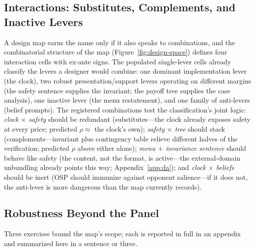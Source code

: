 \subsection{Interactions: Substitutes, Complements, and Inactive Levers}\label{sec:map-interactions}

A design map earns the name only if it also speaks to combinations, and the combinatorial structure of the map (Figure~\ref{fig:design-space}) defines four interaction cells with ex-ante signs. The populated single-lever cells already classify the levers a designer would combine: one dominant implementation lever (the clock), two robust presentation/support levers operating on different margins (the safety sentence supplies the invariant; the payoff tree supplies the case analysis), one inactive lever (the menu restatement), and one family of anti-levers (belief prompts). The registered combinations test the classification's joint logic: \emph{clock $\times$ safety} should be redundant (substitutes---the clock already exposes safety at every price; predicted $\rho \approx$ the clock's own); \emph{safety $\times$ tree} should stack (complements---invariant plus contingency table relieve different halves of the verification; predicted $\rho$ above either alone); \emph{menu $+$ invariance sentence} should behave like safety (the content, not the format, is active---the external-domain unbundling already points this way; Appendix~\ref{app:da}); and \emph{clock $\times$ beliefs} should be inert (OSP should immunize against opponent salience---if it does not, the anti-lever is more dangerous than the map currently records). 

\subsection{Robustness Beyond the Panel}\label{sec:map-robustness}

Three exercises bound the map's scope; each is reported in full in an appendix and summarized here in a sentence or three.

